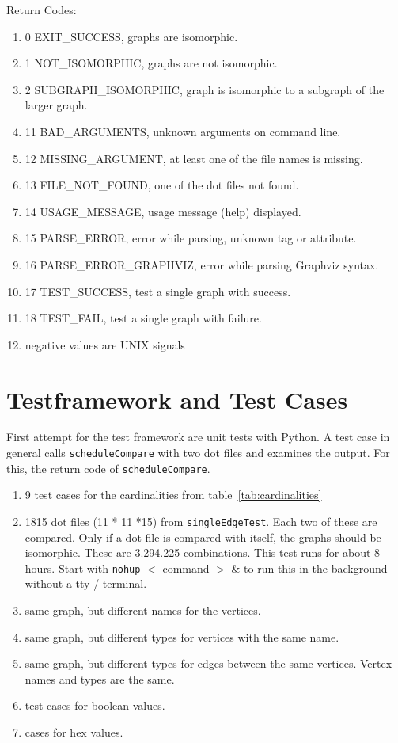 \documentclass[12pt,a4paper]{report}
\begin{document}
Return Codes:
\begin{enumerate}
  \item 0 EXIT\_SUCCESS, graphs are isomorphic.
  \item 1 NOT\_ISOMORPHIC, graphs are not isomorphic.
  \item 2 SUBGRAPH\_ISOMORPHIC, graph is isomorphic to a subgraph of the larger graph.
  \item 11 BAD\_ARGUMENTS, unknown arguments on command line.
  \item 12 MISSING\_ARGUMENT, at least one of the file names is missing.
  \item 13 FILE\_NOT\_FOUND, one of the dot files not found.
  \item 14 USAGE\_MESSAGE, usage message (help) displayed.
  \item 15 PARSE\_ERROR, error while parsing, unknown tag or attribute.
  \item 16 PARSE_ERROR_GRAPHVIZ, error while parsing Graphviz syntax.
  \item 17 TEST\_SUCCESS, test a single graph with success.
  \item 18 TEST\_FAIL, test a single graph with failure.
  \item negative values are UNIX signals
\end{enumerate}

\chapter{Testframework and Test Cases}
First attempt for the test framework are unit tests with Python. A test case in general calls \texttt{scheduleCompare} with two dot files and examines the output. For this, the return code of \texttt{scheduleCompare}.

\begin{enumerate}
  \item 9 test cases for the cardinalities from table~\ref{tab:cardinalities}
  \item 1815 dot files (11 * 11 *15) from \texttt{singleEdgeTest}. Each two of these are compared. Only if a dot file is compared with itself, the graphs should be isomorphic. These are 3.294.225 combinations.
This test runs for about 8 hours. Start with \texttt{nohup} $<$ command $>$ \& to run this in the background without a tty / terminal.
  \item same graph, but different names for the vertices.
  \item same graph, but different types for vertices with the same name.
  \item same graph, but different types for edges between the same vertices. Vertex names and types are the same.
  \item test cases for boolean values.
  \item cases for hex values.
\end{enumerate}
\end{document}

